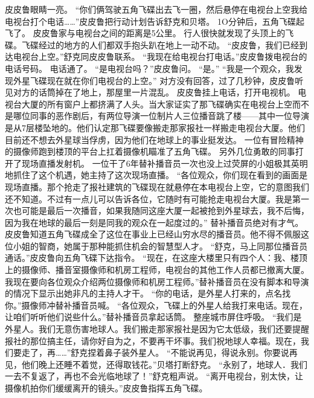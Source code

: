 \documentclass[a4paper,12pt,UTF8,twoside]{ctexbook}
\begin{document}
        皮皮鲁眼睛一亮。 
        “你们俩驾驶五角飞碟出去飞一圈，然后悬停在电视台上空我给电视台打个电话……”皮皮鲁把行动计划告诉舒克和贝塔。 
        1O分钟后，五角飞碟起飞了。 
        皮皮鲁家与电视台之间的距离是5公里。 
        行人很快就发现了头顶上的飞碟。飞碟经过的地方的人们都双手抱头趴在地上一动不动。 
        “皮皮鲁，我们已经到达电视台上空。”舒克同皮皮鲁联系。 
        “我现在给电视台打电话。”皮皮鲁拨电视台的电话号码。 
        电话通了。 
        “是电视台吗？”皮皮鲁问。 
        “是。” 
        “我是一个观众，我发现外星飞碟现在就在你们电视台的上空。” 
        对方没有回答，过了几秒钟，皮皮鲁听见对方的话筒掉在了地上，那屋里一片混乱。 
        皮皮鲁挂上电话，打开电视机。 
        电视台大厦的所有窗户上都挤满了人头。当大家证实了那飞碟确实在电视台上空而不是哪位同事的恶作剧后，有两位导演一位制片人三位播音跳了楼——其中一位导演是从7层楼坠地的。他们认定那飞碟要像搬走那家报社一样搬走电视台大厦。他们目前还不想去外星球当俘虏，因为他们在地球上的事业挺发达。 
        一位有冒险精神的摄像师跑到楼顶的平台上扛着摄像机瞄准了五角飞碟。 
        另外几位勇敢的同事打开了现场直播发射机。 
        一位干了6年替补播音员一次也没上过荧屏的小姐极其英明地抓住了这个机遇，她主持了这次现场直播。 
        “各位观众，你们现在看到的画面是现场直播。那个抢走了报社建筑的飞碟现在就悬停在本电视台上空，它的意图我们还不知道。不过有一点儿可以告诉各位，它随时有可能抢走电视台大厦。我是第一次也可能是最后一次播音，如果我随同这座大厦一起被抢到外星球去，我不后悔，因为我在地球的最后一刻是同我的观众在一起度过的。” 
        替补播音员绝对有才气。 
        皮皮鲁知道五角飞碟成全了这位在事业上已经山穷水尽的播音员。他不得不佩服这位小姐的智商，她属于那种能抓住机会的智慧型人才。 
        “舒克，马上同那位播音员通话。”皮皮鲁向五角飞碟下达指令。 
        “现在，在这座大楼里只有四个人：我、楼顶上的摄像师、播音室摄像师和机房工程师，电视台的其他工作人员都已撤离大厦。我现在要向各位观众介绍两位摄像师和机房工程师。”替补播音员在没有脚本和导演的情况下显示出她非凡的主持人才干。 
        “你的电话，是外星人打来的，点名找你。”摄像师冲替补播音员喊。 
        “各位观众，飞碟上的外星人给我打来电话。现在，让咱们听听他们说些什么。”替补播音员拿起话筒。 
        整座城市屏住呼吸。 
        “我们是外星人。我们无意伤害地球人。我们搬走那家报社是因为它太低级，我们还要提醒报社的那位搞主任，请你好自为之，不要再干坏事。我们祝地球人幸福。现在，我们要走了，再……”舒克捏着鼻子装外星人。 
        “不能说再见，得说永别。你要说再见，他们晚上还睡不着觉，还得取钱花。”贝塔打断舒克。 
        “永别了，地球人．我们一去不复返了，再也不会光临地球了！”舒克粗声说。 
        “离开电视台，别太快，让摄像机拍你们缓缓离开的镜头。”皮皮鲁指挥五角飞碟。 
\end{document}
